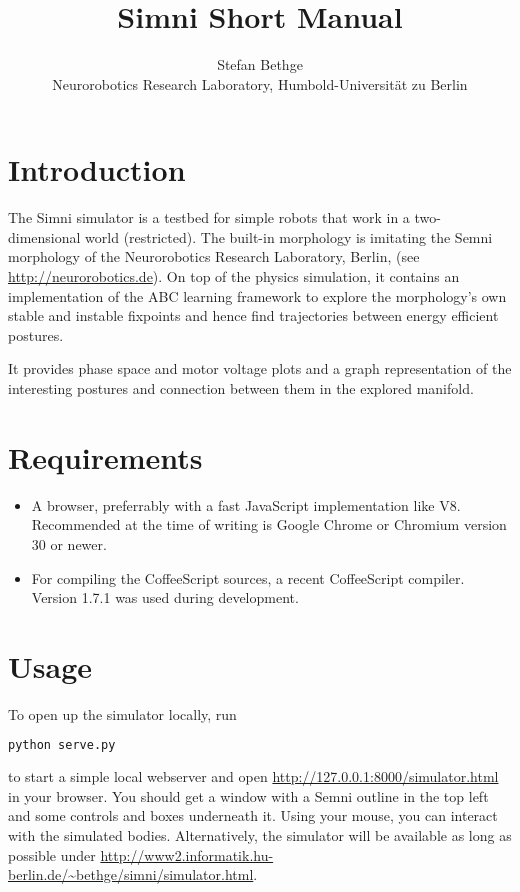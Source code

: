 \documentclass[10pt,a4paper]{article}
\begin{document}
\title{Simni Short Manual}
\author{Stefan Bethge\\
Neurorobotics Research Laboratory, Humbold-Universität zu Berlin}

\maketitle
\tableofcontents
\newpage
{}

\section{Introduction}

The Simni simulator is a testbed for simple robots that work in a two-dimensional world
(restricted). The built-in morphology is imitating the Semni morphology of the Neurorobotics
Research Laboratory, Berlin, (see \url{http://neurorobotics.de}).  On top of the physics simulation,
it contains an implementation of the ABC learning framework to explore the morphology's own stable
and instable fixpoints and hence find trajectories between energy efficient postures. 

It provides phase space and motor voltage plots and a graph representation of the interesting
postures and connection between them in the explored manifold.

\section{Requirements}

\begin{itemize}
\item A browser, preferrably with a fast JavaScript implementation like V8. Recommended at the time
    of writing is Google Chrome or Chromium version 30 or newer.
\item For compiling the CoffeeScript sources, a recent CoffeeScript compiler. Version 1.7.1 was used
    during development.

\end{itemize}

\section{Usage}

To open up the simulator locally, run
\begin{lstlisting}[language=bash]
python serve.py
\end{lstlisting}
to start a simple local webserver and open \url{http://127.0.0.1:8000/simulator.html} in your
browser.
You should get a window with a Semni outline in the top left and some controls and boxes underneath
it. Using your mouse, you can interact with the simulated bodies.
Alternatively, the simulator will be available as long as possible under
\url{http://www2.informatik.hu-berlin.de/~bethge/simni/simulator.html}.
\end{document}
